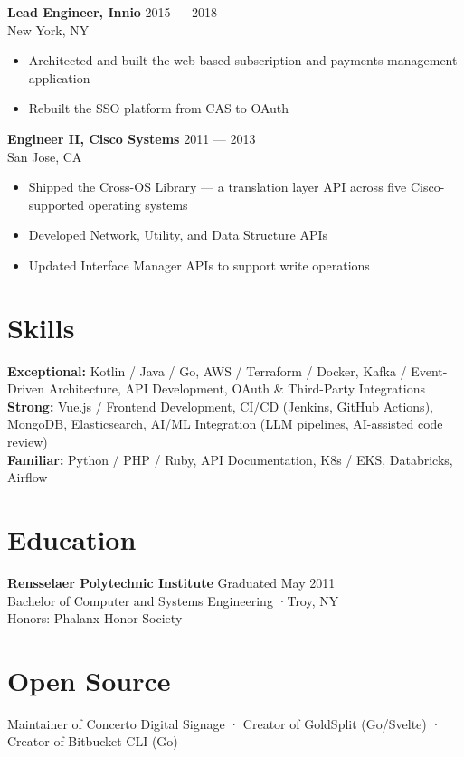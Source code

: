 \documentclass[11pt,letterpaper]{article}
\begin{document}
\vspace{4pt}
\textbf{Lead Engineer, Innio} \hfill {\small 2015 --- 2018}\\
{\small New York, NY}
\begin{itemize}
  \item Architected and built the web-based subscription and payments management application
  \item Rebuilt the SSO platform from CAS to OAuth
\end{itemize}

\vspace{4pt}
\textbf{Engineer II, Cisco Systems} \hfill {\small 2011 --- 2013}\\
{\small San Jose, CA}
\begin{itemize}
  \item Shipped the Cross-OS Library --- a translation layer API across five Cisco-supported operating systems
  \item Developed Network, Utility, and Data Structure APIs
  \item Updated Interface Manager APIs to support write operations
\end{itemize}

\section{Skills}

\textbf{Exceptional:} Kotlin / Java / Go, AWS / Terraform / Docker, Kafka / Event-Driven Architecture, API Development, OAuth \& Third-Party Integrations\\
\textbf{Strong:} Vue.js / Frontend Development, CI/CD (Jenkins, GitHub Actions), MongoDB, Elasticsearch, AI/ML Integration (LLM pipelines, AI-assisted code review)\\
\textbf{Familiar:} Python / PHP / Ruby, API Documentation, K8s / EKS, Databricks, Airflow

\section{Education}

\textbf{Rensselaer Polytechnic Institute} \hfill {\small Graduated May 2011}\\
{\small Bachelor of Computer and Systems Engineering \quad·\quad Troy, NY}\\
{\small Honors: Phalanx Honor Society}

\section{Open Source}

Maintainer of Concerto Digital Signage · Creator of GoldSplit (Go/Svelte) · Creator of Bitbucket CLI (Go)
\end{document}
